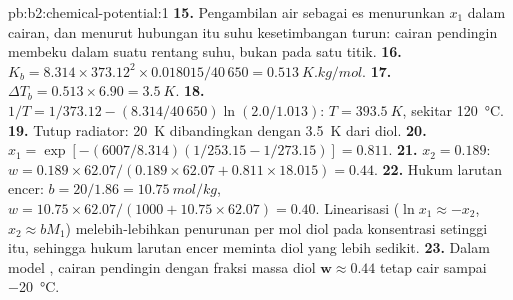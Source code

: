 \begin{solution}{pb:b2:chemical-potential:1}
\textbf{15.} Pengambilan air sebagai es menurunkan $x_1$ dalam cairan, dan
menurut hubungan itu suhu kesetimbangan turun: cairan pendingin membeku
dalam suatu rentang suhu, bukan pada satu titik.
\textbf{16.} $K_b = 8.314 \times 373.12^2 \times 0.018015/40\,650 =
\qty{0.513}{K.kg/mol}$.
\textbf{17.} $\Delta T_b = 0.513 \times 6.90 = \qty{3.5}{K}$.
\textbf{18.} $1/T = 1/373.12 - (8.314/40\,650)\ln(2.0/1.013)$:
$T = \qty{393.5}{K}$, sekitar \qty{120}{\celsius}.
\textbf{19.} Tutup radiator: \qty{20}{K} dibandingkan dengan \qty{3.5}{K}
dari diol.
\textbf{20.} $x_1 = \exp[-(6007/8.314)(1/253.15 - 1/273.15)] = 0.811$.
\textbf{21.} $x_2 = 0.189$: $w = 0.189 \times 62.07/(0.189 \times 62.07 + 0.811
\times 18.015) = 0.44$.
\textbf{22.} Hukum larutan encer: $b = 20/1.86 = \qty{10.75}{mol/kg}$,
$w = 10.75 \times
62.07/(1000 + 10.75 \times 62.07) = 0.40$. Linearisasi
($\ln x_1 \approx
-x_2$, $x_2 \approx bM_1$) melebih-lebihkan penurunan per
mol diol pada konsentrasi setinggi itu, sehingga hukum larutan encer
meminta diol yang lebih sedikit.
\textbf{23.} Dalam model , cairan pendingin dengan fraksi
massa diol $\boldsymbol{w \approx 0.44}$ tetap cair sampai
\qty{-20}{\celsius}.
\end{solution}
